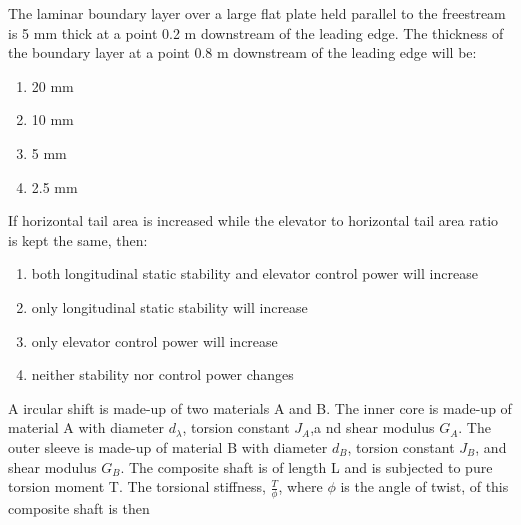     \item The laminar boundary layer over a large flat plate held parallel to the freestream is 5 mm thick at a point 0.2 m downstream of the leading edge. The thickness of the boundary layer at a point 0.8 m downstream of the leading edge will be:
    \begin{enumerate}
        \item 20 mm
        \item 10 mm
        \item 5 mm
        \item 2.5 mm
    \end{enumerate}

    \item If horizontal tail area is increased while the elevator to horizontal tail area ratio is kept the same, then:
    \begin{enumerate}
        \item both longitudinal static stability and elevator control power will increase
        \item only longitudinal static stability will increase
        \item only elevator control power will increase
        \item neither stability nor control power changes
    \end{enumerate}
\newpage
    \item A ircular shift is made-up of two materials A and B. The inner core is made-up of material A with diameter $d_\lambda$, torsion constant $J_A$,a nd shear modulus $G_A$. The outer sleeve is made-up of material B with diameter $d_B$, torsion constant $J_B$, and shear modulus $G_B$. The composite shaft is of length L and is subjected to pure torsion moment T. The torsional stiffness, $\frac{T}{\phi}$, where $\phi$ is the angle of twist, of this composite shaft is then
